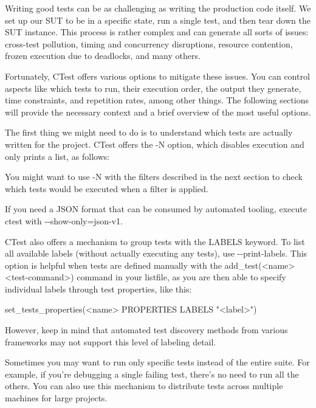 Writing good tests can be as challenging as writing the production code itself. We set up our SUT to be in a specific state, run a single test, and then tear down the SUT instance. This process is rather complex and can generate all sorts of issues: cross-test pollution, timing and concurrency disruptions, resource contention, frozen execution due to deadlocks, and many others.

Fortunately, CTest offers various options to mitigate these issues. You can control aspects like which tests to run, their execution order, the output they generate, time constraints, and repetition rates, among other things. The following sections will provide the necessary context and a brief overview of the most useful options.


The first thing we might need to do is to understand which tests are actually written for the project. CTest offers the -N option, which disables execution and only prints a list, as follows:


You might want to use -N with the filters described in the next section to check which tests would be executed when a filter is applied.

If you need a JSON format that can be consumed by automated tooling, execute ctest with -{}-show-only=json-v1.

CTest also offers a mechanism to group tests with the LABELS keyword. To list all available labels (without actually executing any tests), use -{}-print-labels. This option is helpful when tests are defined manually with the add\_test(<name> <test-command>) command in your listfile, as you are then able to specify individual labels through test properties, like this:

\begin{cmake}
set_tests_properties(<name> PROPERTIES LABELS "<label>")
\end{cmake}

However, keep in mind that automated test discovery methods from various frameworks may not support this level of labeling detail.


Sometimes you may want to run only specific tests instead of the entire suite. For example, if you’re debugging a single failing test, there’s no need to run all the others. You can also use this mechanism to distribute tests across multiple machines for large projects.

